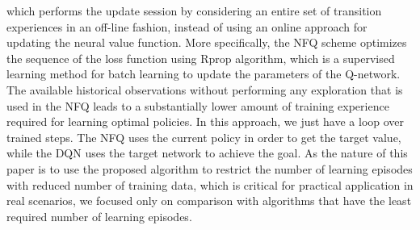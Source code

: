 \documentclass{ieeeaccess}
\begin{document}
which performs the update session by considering an entire set of transition experiences in an off-line fashion, instead of using an online approach for updating the neural value function. More specifically, the NFQ scheme optimizes the sequence of the loss function using Rprop algorithm, which is a supervised learning method for batch learning to update the parameters of the Q-network. The available historical observations without performing any exploration that is used in the NFQ leads to a substantially lower amount of training experience required for learning optimal policies. In this approach, we just have a loop over trained steps. The NFQ uses the current policy in order to get the target value, while the DQN uses the target network to achieve the goal. As the nature of this paper is to use the proposed algorithm to restrict the number of learning episodes with reduced number of training data, which is critical for practical application in real scenarios, we focused only on comparison with algorithms that have the least required number of learning episodes. 
\end{document}
